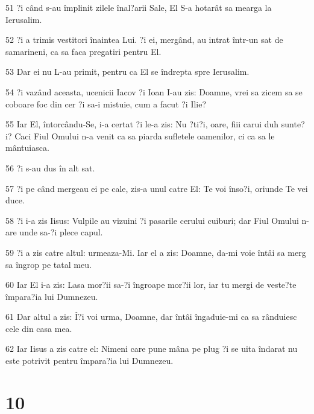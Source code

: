 \par 51 ?i când s-au împlinit zilele înal?arii Sale, El S-a hotarât sa mearga la Ierusalim.
\par 52 ?i a trimis vestitori înaintea Lui. ?i ei, mergând, au intrat într-un sat de samarineni, ca sa faca pregatiri pentru El.
\par 53 Dar ei nu L-au primit, pentru ca El se îndrepta spre Ierusalim.
\par 54 ?i vazând aceasta, ucenicii Iacov ?i Ioan I-au zis: Doamne, vrei sa zicem sa se coboare foc din cer ?i sa-i mistuie, cum a facut ?i Ilie?
\par 55 Iar El, întorcându-Se, i-a certat ?i le-a zis: Nu ?ti?i, oare, fiii carui duh sunte?i? Caci Fiul Omului n-a venit ca sa piarda sufletele oamenilor, ci ca sa le mântuiasca.
\par 56 ?i s-au dus în alt sat.
\par 57 ?i pe când mergeau ei pe cale, zis-a unul catre El: Te voi înso?i, oriunde Te vei duce.
\par 58 ?i i-a zis Iisus: Vulpile au vizuini ?i pasarile cerului cuiburi; dar Fiul Omului n-are unde sa-?i plece capul.
\par 59 ?i a zis catre altul: urmeaza-Mi. Iar el a zis: Doamne, da-mi voie întâi sa merg sa îngrop pe tatal meu.
\par 60 Iar El i-a zis: Lasa mor?ii sa-?i îngroape mor?ii lor, iar tu mergi de veste?te împara?ia lui Dumnezeu.
\par 61 Dar altul a zis: Î?i voi urma, Doamne, dar întâi îngaduie-mi ca sa rânduiesc cele din casa mea.
\par 62 Iar Iisus a zis catre el: Nimeni care pune mâna pe plug ?i se uita îndarat nu este potrivit pentru împara?ia lui Dumnezeu.

\chapter{10}

